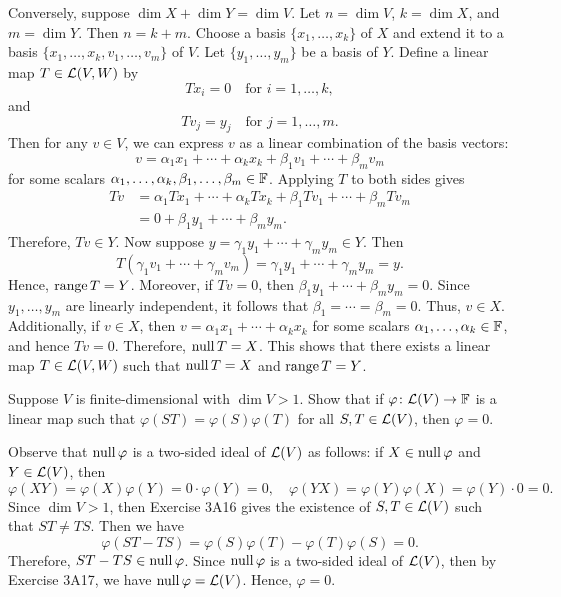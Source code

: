 \begin{exc}
\begin{solution}
Conversely, suppose $\dim X+\dim Y=\dim V$. Let $n=\dim V$, $k=\dim X$, and
$m=\dim Y$. Then $n=k+m$. Choose a basis $\{x_1,\dots,x_k\}$ of $X$ and extend
it to a basis $\{x_1,\dots,x_k,v_1,\dots,v_m\}$ of $V$. Let
$\{y_1,\dots,y_m\}$ be a basis of $Y$. Define a linear map $T\in\mathcal{L}(V,W)$ by
\[ Tx_i=0 \quad\text{for } i=1,\dots,k, \]
and
\[ Tv_j=y_j \quad\text{for } j=1,\dots,m. \]
Then for any $v\in V$, we can express $v$ as a linear combination of the basis
vectors:
\[ v=\alpha_1x_1+\cdots+\alpha_kx_k+\beta_1v_1+\cdots+\beta_mv_m \]
for some scalars $\alpha_1,\dots,\alpha_k,\beta_1,\dots,\beta_m\in\mathbb{F}$. Applying
$T$ to both sides gives
\begin{align*}
Tv &= \alpha_1Tx_1+\cdots+\alpha_kTx_k+\beta_1Tv_1+\cdots+\beta_mTv_m\\
   &= 0+\beta_1y_1+\cdots+\beta_my_m.
\end{align*}
Therefore, $Tv\in Y$. Now suppose $y=\gamma_1y_1+\cdots+\gamma_my_m\in Y$. Then
\[ T(\gamma_1v_1+\cdots+\gamma_mv_m)=\gamma_1y_1+\cdots+\gamma_my_m=y. \]
Hence, $\operatorname{range} T=Y$. Moreover, if $Tv=0$, then $\beta_1y_1+\cdots+\beta_my_m=0$.
Since $y_1,\dots,y_m$ are linearly independent, it follows that
$\beta_1=\cdots=\beta_m=0$. Thus, $v\in X$. Additionally, if $v\in X$, then
$v=\alpha_1x_1+\cdots+\alpha_kx_k$ for some scalars
$\alpha_1,\dots,\alpha_k\in\mathbb{F}$, and hence $Tv=0$. Therefore, $\operatorname{null} T=X$. This
shows that there exists a linear map $T\in\mathcal{L}(V,W)$ such that $\operatorname{null} T=X$ and
$\operatorname{range} T=Y$.
\end{solution}

\begin{exercise}
Suppose $V$ is finite-dimensional with $\dim V>1$. Show that if
$\varphi\colon\mathcal{L}(V)\to\mathbb{F}$ is a linear map such that
$\varphi(ST)=\varphi(S)\varphi(T)$ for all $S,T\in\mathcal{L}(V)$, then $\varphi=0$.
\end{exercise}
\begin{solution}
Observe that $\operatorname{null}\varphi$ is a two-sided ideal of $\mathcal{L}(V)$ as follows: if
$X\in\operatorname{null}\varphi$ and $Y\in\mathcal{L}(V)$, then
\[ \varphi(XY)=\varphi(X)\varphi(Y)=0\cdot\varphi(Y)=0, \quad
   \varphi(YX)=\varphi(Y)\varphi(X)=\varphi(Y)\cdot0=0. \]
Since $\dim V>1$, then Exercise 3A16 gives the existence of $S,T\in\mathcal{L}(V)$
such that $ST\ne TS$. Then we have
\[ \varphi(ST-TS)=\varphi(S)\varphi(T)-\varphi(T)\varphi(S)=0. \]
Therefore, $ST-TS\in\operatorname{null}\varphi$. Since $\operatorname{null}\varphi$ is a two-sided ideal of
$\mathcal{L}(V)$, then by Exercise 3A17, we have $\operatorname{null}\varphi=\mathcal{L}(V)$. Hence,
$\varphi=0$.
\end{solution}


\end{exc}
